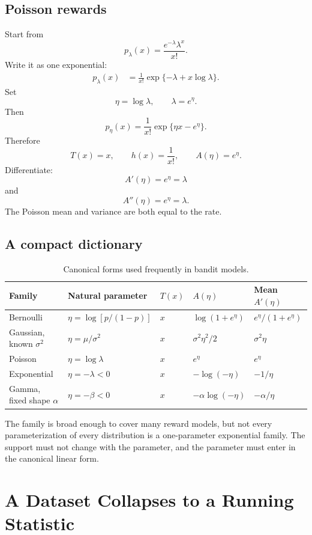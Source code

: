 \documentclass[en,nofont,11pt]{elegantbook}
\begin{document}
\section{Poisson rewards}

Start from
\[
p_\lambda(x)=\frac{e^{-\lambda}\lambda^x}{x!}.
\]
Write it as one exponential:
\begin{align*}
p_\lambda(x)
&=\frac{1}{x!}\exp\{-\lambda+x\log\lambda\}.
\end{align*}
Set
\[
\eta=\log\lambda,
\qquad
\lambda=e^\eta.
\]
Then
\[
p_\eta(x)
=
\frac{1}{x!}\exp\{\eta x-e^\eta\}.
\]
Therefore
\[
T(x)=x,
\qquad
h(x)=\frac{1}{x!},
\qquad
A(\eta)=e^\eta.
\]
Differentiate:
\[
A'(\eta)=e^\eta=\lambda
\]
and
\[
A''(\eta)=e^\eta=\lambda.
\]
The Poisson mean and variance are both equal to the rate.

\section{A compact dictionary}

\begin{table}[H]
\centering
\caption{Canonical forms used frequently in bandit models.}
\small
\setlength{\tabcolsep}{4pt}
\begin{tabular}{L{0.17\textwidth}L{0.17\textwidth}L{0.10\textwidth}L{0.19\textwidth}L{0.18\textwidth}}
\toprule
Family & Natural parameter & $T(x)$ & $A(\eta)$ & Mean $A'(\eta)$ \\
\midrule
Bernoulli & $\eta=\log[p/(1-p)]$ & $x$ & $\log(1+e^\eta)$ & $e^\eta/(1+e^\eta)$ \\
Gaussian, known $\sigma^2$ & $\eta=\mu/\sigma^2$ & $x$ & $\sigma^2\eta^2/2$ & $\sigma^2\eta$ \\
Poisson & $\eta=\log\lambda$ & $x$ & $e^\eta$ & $e^\eta$ \\
Exponential & $\eta=-\lambda<0$ & $x$ & $-\log(-\eta)$ & $-1/\eta$ \\
Gamma, fixed shape $\alpha$ & $\eta=-\beta<0$ & $x$ & $-\alpha\log(-\eta)$ & $-\alpha/\eta$ \\
\bottomrule
\end{tabular}
\end{table}

The family is broad enough to cover many reward models, but not every parameterization of every distribution is a one-parameter exponential family. The support must not change with the parameter, and the parameter must enter in the canonical linear form.

\chapter{A Dataset Collapses to a Running Statistic}
\end{document}
